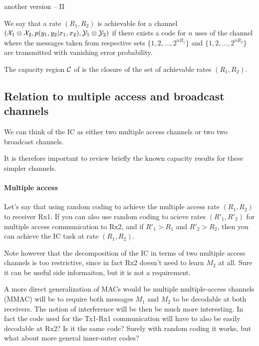 \documentclass[aps,11pt,twoside,letterpaper]{revtex4}
\begin{document}
        another version -- II

        
        \begin{definition}
            We say that a rate $(R_1,R_2)$ is achievable for a channel $({\cal X}_1 \otimes {\cal X}_2, p(y_1,y_2|x_1,x_2), {\cal Y}_1 \otimes {\cal Y}_2)$
            if there exists a code for $n$ uses of the channel where the messages taken from respective sets $\{1,2,\ldots,2^{nR_1} \}$ and
             $\{1,2,\ldots,2^{nR_2} \}$ are transmitted with vanishing error probability.
        \end{definition}
        
        
        \begin{definition}[Capacity]
            The capacity region ${\cal C}$ of is the closure of the set of achievable rates $(R_1,R_2)$.
        \end{definition}

        

    \subsection{Relation to multiple access and broadcast channels}

        We can think of the IC as either two multiple access channels or
        two two broadcast channels.
        
        It is therefore important to review briefly the known capacity results
        for these simpler channels.

        \paragraph{Multiple access}

            Let's say that using random coding to achieve the 
            multiple access rate $(R_1,R_2)$ to receiver Rx1.
            If you can also use random coding to acieve 
            rates $(R'_1,R'_2)$ for  multiple access communication to Rx2, 
            and if $R'_1 > R_1$ and $R'_2 > R_2$, then you can
            achieve the IC task at rate  $(R_1,R_2)$.
            
            Note however that the decomposition of the IC in terms of
            two multiple access channels is too restrictive,  since in fact
            Rx2 doesn't need to learn $M_2$ at all. 
            Sure it can be useful side informaiton, but it is not a requirement.
            
            A more direct generalization of MACs would be multiple multiple-access channels (MMAC)
            will be to require both messages $M_1$ and $M_2$ to be decodable
            at both receivers.
            The notion of interference will be then be much more interesting.
            In fact the code used for the Tx1-Rx1 communication will have to also
            be easily decodable at Rx2? Is it the same code? Surely with random
            coding it works, but what about more general inner-outer codes?
            
\end{document}
